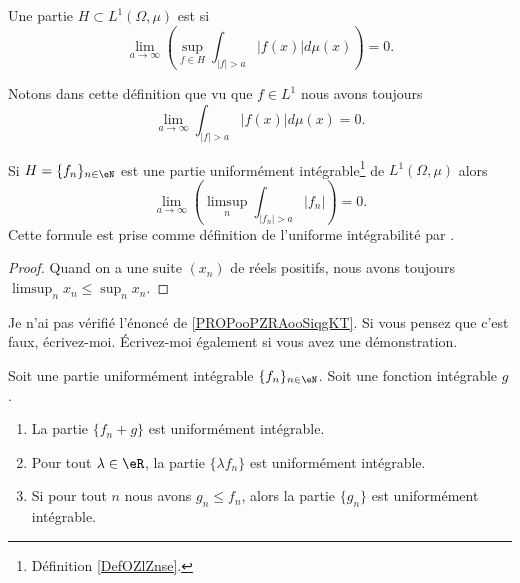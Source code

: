 \begin{definition}  \label{DefOZlZnse}
	Une partie \( H\subset L^1(\Omega,\mu)\) est  si
	\begin{equation}
		\lim_{a\to \infty}\left( \sup_{f\in H}\int_{  | f |>a   }| f(x) |d\mu(x) \right)=0.
	\end{equation}
\end{definition}
Notons dans cette définition que vu que \( f\in L^1\) nous avons toujours
\begin{equation}
	\lim_{a\to \infty}\int_{| f |>a}| f(x) |d\mu(x)=0.
\end{equation}

\begin{lemma}	\label{LEMooUOQDooIkVyWm}
	Si \( H=\{ f_n \}_{n\in \eN}\) est une partie uniformément intégrable\footnote{Définition \ref{DefOZlZnse}.} de \( L^1(\Omega,\mu)\) alors
	\begin{equation}
		\lim_{a\to \infty}\left(   \limsup_n\int_{| f_n |>a}| f_n |  \right)=0.
	\end{equation}
	Cette formule est prise comme définition de l'uniforme intégrabilité par \cite{BIBvitali2}.
\end{lemma}

\begin{proof}
	Quand on a une suite \( (x_n)\) de réels positifs, nous avons toujours \( \limsup_nx_n\leq \sup_nx_n \).
\end{proof}

\begin{probleme}
	Je n'ai pas vérifié l'énoncé de \ref{PROPooPZRAooSiqgKT}. Si vous pensez que c'est faux, écrivez-moi. Écrivez-moi également si vous avez une démonstration.
\end{probleme}

\begin{proposition}	\label{PROPooPZRAooSiqgKT}
	Soit une partie uniformément intégrable \( \{ f_n \}_{n\in \eN}\). Soit une fonction intégrable \( g\).
	\begin{enumerate}
		\item
		      La partie \( \{ f_n+g \}\) est uniformément intégrable.
		\item
		      Pour tout \( \lambda\in \eR\), la partie \( \{ \lambda f_n \}\) est uniformément intégrable.
		\item
		      Si pour tout \( n\) nous avons \( g_n\leq f_n\), alors la partie \( \{ g_n \}\) est uniformément intégrable.
	\end{enumerate}
\end{proposition}


